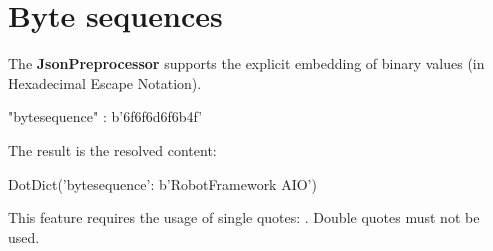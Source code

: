 \newpage

\section{Byte sequences}

The \textbf{JsonPreprocessor} supports the explicit embedding of binary values (in Hexadecimal Escape Notation).

\begin{pythoncode}
"bytesequence" : b'\x6f\x6f\x6d\x6f\x6b\x4f'
\end{pythoncode}

The result is the resolved content:

\begin{pythonlog}
DotDict({'bytesequence': b'RobotFramework AIO'})
\end{pythonlog}

This feature requires the usage of single quotes: . Double quotes must not be used.




